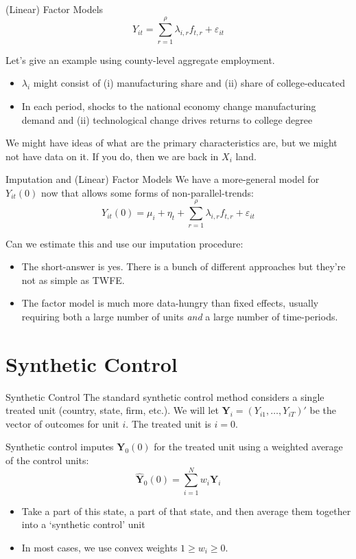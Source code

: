 \documentclass[t]{beamer}
\begin{document}
\begin{frame}{(Linear) Factor Models}
  $$
    Y_{it} = \sum_{r=1}^\rho \lambda_{i, r} f_{t, r} + \varepsilon_{it}
  $$

  \bigskip
  Let's give an example using county-level aggregate employment.
  \begin{itemize}
    \item $\lambda_i$ might consist of (i) manufacturing share and (ii) share of college-educated
    \item In each period, shocks to the national economy change manufacturing demand and (ii) technological change drives returns to college degree
  \end{itemize}

  \pause
  \bigskip
  We might have ideas of what are the primary characteristics are, but we might not have data on it. If you do, then we are back in $X_i$ land.
\end{frame}

\begin{frame}{Imputation and (Linear) Factor Models}
  We have a more-general model for $Y_{it}(0)$ now that allows some forms of non-parallel-trends:
  $$
    Y_{it}(0) =  \mu_i + \eta_t + \sum_{r=1}^\rho \lambda_{i, r} f_{t, r} + \varepsilon_{it}
  $$

  \bigskip\bigskip
  Can we estimate this and use our imputation procedure:
  \begin{itemize}
    \item The short-answer is yes. There is a bunch of different approaches but they're not as simple as TWFE.

    \item The factor model is much more data-hungry than fixed effects, usually requiring both a large number of units \emph{ and } a large number of time-periods.
  \end{itemize}
\end{frame}





\section{Synthetic Control}

\begin{frame}{Synthetic Control}
  The standard synthetic control method considers a single treated unit (country, state, firm, etc.). We will let $\bm{Y}_i = \left( Y_{i1}, \dots, Y_{iT} \right)'$ be the vector of outcomes for unit $i$. The treated unit is $i = 0$.

  \bigskip\pause
  Synthetic control imputes $\bm{Y}_0(0)$ for the treated unit using a weighted average of the control units:
  $$
    \hat{\bm{Y}}_0(0) = \sum_{i = 1}^N w_i \bm{Y}_i
  $$
  \begin{itemize}
    \item Take a part of this state, a part of that state, and then average them together into a `synthetic control' unit
    \item In most cases, we use convex weights $1 \geq w_i \geq 0$.
  \end{itemize}
\end{frame}
\end{document}
